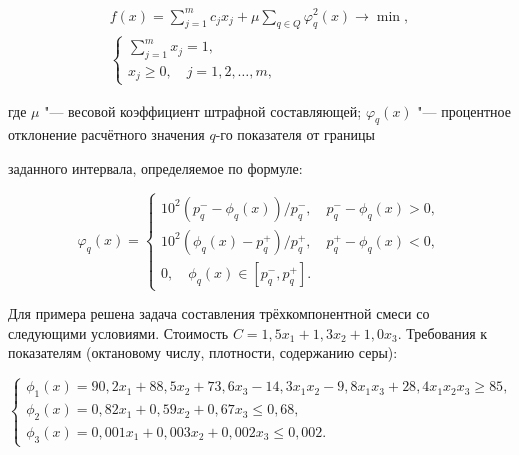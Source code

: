 \begin{gather}

\label{liv:eq5}

f(x)=\sum\limits_{j=1}^m{c_jx_j+\mu\sum\limits_{q\in Q}{\varphi_q^2(x)}}\to\min,

\\

\label{liv:eq6}

\left\{\begin{array}{l}

\sum\limits_{j=1}^m{x_j}=1,\\

x_j\ge0,\quad j=1,2,\dots,m,

\end{array}\right.

\end{gather}

где $\mu$ "--- весовой коэффициент штрафной составляющей; $\varphi_q(x)$ "--- процентное отклонение расчётного значения $q$-го показателя от границы 

заданного интервала, определяемое по формуле: 

$$

\varphi_q(x)=\left\{\begin{array}{l}

10^2(p_q^--\phi_q(x))/p_q^-,\quad p_q^--\phi_q(x)>0,\\

10^2(\phi_q(x)-p_q^+)/p_q^+,\quad p_q^+-\phi_q(x)<0,\\

0,\quad \phi_q(x)\in[p_q^-,p_q^+].

\end{array}\right.

$$



Для примера решена задача составления трёхкомпонентной смеси со следующими условиями. Стоимость $C=1,5x_1+1,3x_2+1,0x_3$. Требования к показателям (октановому числу, плотности, содержанию серы): 

\begin{equation}

\label{liv:eq7}

\left\{\begin{array}{l}

\!\!\!\!\phi_1(x)\!=\!90,2x_1\!+\!88,5x_2\!+\!73,6x_3\!-\!14,3x_1x_2\!-\!9,8x_1x_3\!+\!28,4x_1x_2x_3\!\ge\!85, \\

\!\!\!\!\phi_2(x)\!=\!0,82x_1+0,59x_2+0,67x_3\le0,68, \\

\!\!\!\!\phi_3(x)\!=\!0,001x_1+0,003x_2+0,002x_3\le0,002.

\end{array}\right.

\end{equation}



